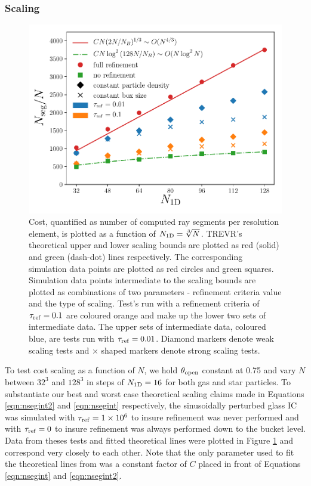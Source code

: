 \documentclass[fleq,usenatbib]{mnras}
\newcommand{\acro}{TREVR}
\providecommand{\e}[1]{\ensuremath{\times10^{#1}}}
\newcommand{\tr}{\tau_{\rm ref}}
\newcommand{\tO}{\theta_{\rm open}}
\begin{document}
\subsubsection{Scaling}
\begin{figure}
\includegraphics[width=1\linewidth]{Figures/particle_scaling.pdf}
\caption{Cost, quantified as number of computed ray segments per resolution 
element, is plotted as a function of $N_{\rm 1D} = \sqrt[3]{N}$. \acro{}'s 
theoretical upper and lower scaling bounds are plotted as red (solid) and 
green (dash-dot) lines respectively. The corresponding simulation data 
points are plotted as red circles and green squares. Simulation data points 
intermediate to the scaling bounds are plotted as combinations of two 
parameters - refinement criteria value and the type of scaling. Test's run 
with a refinement criteria of $\tr=0.1$ are coloured orange and make up the 
lower two sets of intermediate data. The upper sets of intermediate data, 
coloured blue, are tests run with $\tr=0.01$. Diamond markers denote weak 
scaling tests and $\times$ shaped markers denote strong scaling tests.}
\label{fig:pscale}
\end{figure}
To test cost scaling as a function of $N$, we hold $\tO$ constant at 0.75 and
vary $N$ between $32^3$ and $128^3$ in steps of $N_{\rm 1D} = 16$ for both gas 
and star particles. To substantiate our best and worst case theoretical 
scaling claims made in Equations \ref{eqn:nsegint2} and \ref{eqn:nsegint} 
respectively, the sinusoidally perturbed glass IC was simulated with 
$\tr=1\e 6$ to insure refinement was never performed and with $\tr=0$ to 
insure refinement was always performed down to the bucket level. Data from 
theses tests and fitted theoretical lines were plotted in Figure 
\ref{fig:pscale} and correspond very closely to each other. Note that the only 
parameter used to fit the theoretical lines from was a constant factor of $C$ 
placed in front of Equations \ref{eqn:nsegint} and \ref{eqn:nsegint2}.
\end{document}
